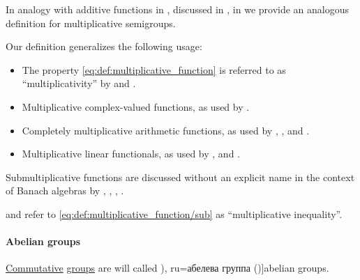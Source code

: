 \begin{remark}\label{rem:multiplicative_function_terminology}
  In analogy with additive functions in , discussed in , in  we provide an analogous definition for multiplicative semigroups.

  Our definition generalizes the following usage:
  \begin{itemize}
    \item The property \eqref{eq:def:multiplicative_function} is referred to as \enquote{multiplicativity} by  and .

    \item Multiplicative complex-valued functions, as used by .

    \item Completely multiplicative arithmetic functions, as used by ,
    ,
     and .

    \item Multiplicative linear functionals, as used by ,
     and .
  \end{itemize}

  Submultiplicative functions are discussed without an explicit name in the context of Banach algebras by
  ,
  ,
  ,
  .

   and  refer to \eqref{eq:def:multiplicative_function/sub} as \enquote{multiplicative inequality}.
\end{remark}

\paragraph{Abelian groups}

\begin{definition}\label{def:abelian_group}
  \hyperref[def:binary_operation/commutative]{Commutative} \hyperref[def:group]{groups} are will called \term[bg=абелева группа (\cite[75]{ГеновМиховскиМоллов1991Алгебра}), ru=абелева группа (\cite[def. 1.1.1]{Винберг2014Алгебра})]{abelian groups}.
\end{definition}

